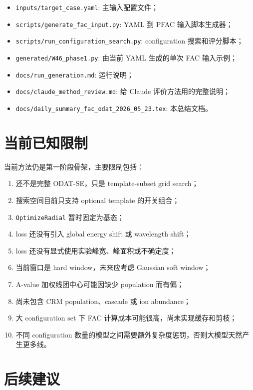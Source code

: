 \documentclass[11pt,a4paper]{article}
\begin{document}
\begin{itemize}
  \item \texttt{inputs/target\_case.yaml}: 主输入配置文件；
  \item \texttt{scripts/generate\_fac\_input.py}: YAML 到 PFAC 输入脚本生成器；
  \item \texttt{scripts/run\_configuration\_search.py}: configuration 搜索和评分脚本；
  \item \texttt{generated/W46\_phase1.py}: 由当前 YAML 生成的单次 FAC 输入示例；
  \item \texttt{docs/run\_generation.md}: 运行说明；
  \item \texttt{docs/claude\_method\_review.md}: 给 Claude 评价方法用的完整说明；
  \item \texttt{docs/daily\_summary\_fac\_odat\_2026\_05\_23.tex}: 本总结文档。
\end{itemize}

\section{当前已知限制}

当前方法仍是第一阶段骨架，主要限制包括：

\begin{enumerate}
  \item 还不是完整 ODAT-SE，只是 template-subset grid search；
  \item 搜索空间目前只支持 optional template 的开关组合；
  \item \texttt{OptimizeRadial} 暂时固定为基态；
  \item loss 还没有引入 global energy shift 或 wavelength shift；
  \item loss 还没有显式使用实验峰宽、峰面积或不确定度；
  \item 当前窗口是 hard window，未来应考虑 Gaussian soft window；
  \item A-value 加权线团中心可能因缺少 population 而有偏；
  \item 尚未包含 CRM population、cascade 或 ion abundance；
  \item 大 configuration set 下 FAC 计算成本可能很高，尚未实现缓存和剪枝；
  \item 不同 configuration 数量的模型之间需要额外复杂度惩罚，否则大模型天然产生更多线。
\end{enumerate}

\section{后续建议}
\end{document}

